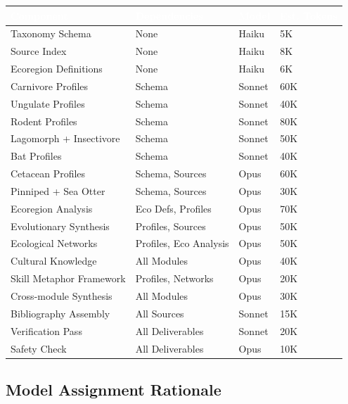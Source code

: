 \documentclass[11pt,letterpaper]{article}
\newcommand{\tableheader}[1]{\textbf{\sffamily\textcolor{white}{#1}}}
\begin{document}
\begin{center}
\begin{tabularx}{\textwidth}{L{3cm}L{2.5cm}C{1.5cm}C{2cm}}
\toprule
{}
\tableheader{Component} & \tableheader{Dependencies} & \tableheader{Model} & \tableheader{Est. Tokens} \\
\midrule
Taxonomy Schema & None & Haiku & 5K \\
Source Index & None & Haiku & 8K \\
Ecoregion Definitions & None & Haiku & 6K \\
Carnivore Profiles & Schema & Sonnet & 60K \\
Ungulate Profiles & Schema & Sonnet & 40K \\
Rodent Profiles & Schema & Sonnet & 80K \\
Lagomorph + Insectivore & Schema & Sonnet & 50K \\
Bat Profiles & Schema & Sonnet & 40K \\
Cetacean Profiles & Schema, Sources & Opus & 60K \\
Pinniped + Sea Otter & Schema, Sources & Opus & 30K \\
Ecoregion Analysis & Eco Defs, Profiles & Opus & 70K \\
Evolutionary Synthesis & Profiles, Sources & Opus & 50K \\
Ecological Networks & Profiles, Eco Analysis & Opus & 50K \\
Cultural Knowledge & All Modules & Opus & 40K \\
Skill Metaphor Framework & Profiles, Networks & Opus & 20K \\
Cross-module Synthesis & All Modules & Opus & 30K \\
Bibliography Assembly & All Sources & Sonnet & 15K \\
Verification Pass & All Deliverables & Sonnet & 20K \\
Safety Check & All Deliverables & Opus & 10K \\
\bottomrule
\end{tabularx}
\end{center}

\subsection{Model Assignment Rationale}
\end{document}
